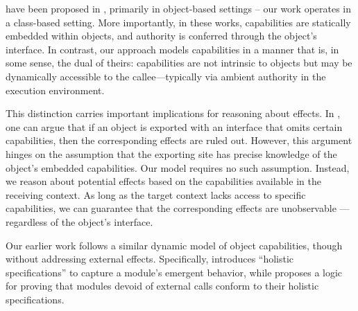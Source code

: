 
 {%
have been proposed in
 \cite{BirkedalL:caps-mmio-conf,ddd,vmsl-pldi2023,irisWasm23},   
 {primarily in object-based settings -- our work operates in a class-based setting.}
 More importantly, in these  works,  capabilities are statically embedded within objects, and authority is conferred through the object’s interface. In contrast, our approach models capabilities in a manner that is, in some sense, the dual of theirs: capabilities are not intrinsic to objects but may be 
 {dynamically accessible to the callee—typically via ambient authority in the execution environment.}}
 
 {This distinction carries important implications for reasoning  about   effects. 
 In  \cite{BirkedalL:caps-mmio-conf,ddd,vmsl-pldi2023,irisWasm23}, one can argue that if an object is exported with an interface that omits certain capabilities, then the corresponding effects are  ruled out. 
 However, this argument hinges on the assumption that the exporting site has precise knowledge of the object’s embedded capabilities.
 Our model requires no such assumption. Instead, we reason about potential effects based on the capabilities available in the receiving context. %
{As long as the target context lacks access to specific capabilities}, we can guarantee that the corresponding effects are unobservable —regardless of the object’s interface.
 }

 

{Our earlier work} %
{\cite{FASE,OOPSLA22}   follows a
similar dynamic model of object capabilities, though without addressing external effects.}
Specifically, \cite{FASE}  introduces “holistic specifications” to capture a module’s emergent behavior, while
\cite{OOPSLA22}  proposes
a logic for proving that modules devoid of external calls conform to their holistic specifications.


